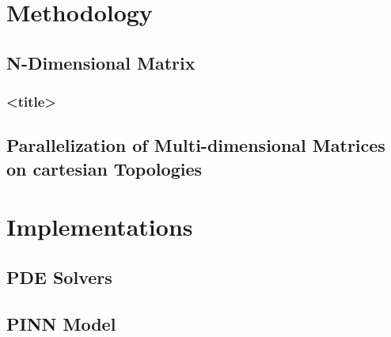 \section{Methodology}

\subsection{N-Dimensional Matrix}
\begin{frame}
  \frametitle{<title>}

  

\end{frame}

\subsection{Parallelization of Multi-dimensional Matrices on cartesian Topologies}


\section{Implementations}
\subsection{PDE Solvers}


\subsection{PINN Model}
